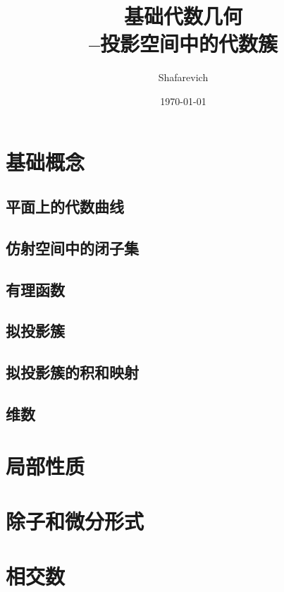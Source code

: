 \documentclass[UTF8]{ctexbook}
\title{基础代数几何 \\--投影空间中的代数簇}
\author{Shafarevich}
\date{\today}
\begin{document}
	\maketitle
	\tableofcontents

	\chapter{基础概念}

	\section{平面上的代数曲线}%
	\label{sec:平面上的代数曲线}
	
	\section{仿射空间中的闭子集}%
	\label{sec:仿射空间中的闭子集}
	
	\section{有理函数}%
	\label{sec:有理函数}
	
	\section{拟投影簇}%
	\label{sec:拟投影簇}
	
	\section{拟投影簇的积和映射}%
	\label{sec:拟投影簇的积和映射}
	
	\section{维数}%
	\label{sec:维数}
	

	\chapter{局部性质}

	\chapter{除子和微分形式}

	\chapter{相交数}
\end{document}
